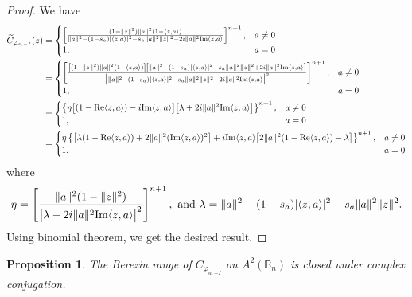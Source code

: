 \documentclass{amsart}
\newtheorem{proposition}{Proposition}
\theoremstyle{remark}
\newcommand{\B}{\mathbb{B}}
\begin{document}
\begin{proof}
We have
     \begin{align*}
        \widetilde{C}_{\varphi_{a,-I}}(z) &= 
        \begin{cases}
            \left[\frac{(1 - \|z\|^{2})\|a\|^{2}(1 - \langle z,a \rangle)}{\|a\|^{2} - (1-s_a)|\langle z,a \rangle|^2 - s_{a}\|a\|^2\|z\|^2-2i\|a\|^{2}\mathrm{Im}\langle z,a \rangle}\right]^{n+1}, & a \neq 0 \\
            1, & a = 0
        \end{cases} \\
        &= 
         \begin{cases}
            \left[\frac{\left[(1 - \|z\|^{2})\|a\|^{2}(1 - \langle z,a \rangle)\right]\left[\|a\|^{2} - (1-s_a)|\langle z,a \rangle|^2 - s_{a}\|a\|^2\|z\|^2+2i\|a\|^{2}\mathrm{Im}\langle z,a \rangle \right]}{\big{|}\|a\|^{2} - (1-s_a)|\langle z,a \rangle|^2 - s_{a}\|a\|^2\|z\|^2-2i\|a\|^{2}\mathrm{Im}\langle z,a \rangle\big{|}^2}\right]^{n+1}, & a \neq 0 \\
            1, & a = 0
        \end{cases} \\
        &= 
         \begin{cases}
          \left\{\eta\big{[}(1 - \mathrm{Re}\langle z,a\rangle) - i\mathrm{Im}\langle z,a\rangle \big{]}\big{[}\lambda+2i\|a\|^{2}\mathrm{Im}\langle z,a \rangle \big{]}\right\}^{n+1}, & a \neq 0 \\
            1, & a = 0
        \end{cases} \\
        &= 
         \begin{cases}
          \eta\left\{\big{[}\lambda(1 - \mathrm{Re}\langle z,a\rangle)  + 2\|a\|^{2}(\mathrm{Im}\langle z,a \rangle)^2\big{]} + i\mathrm{Im}\langle z,a \rangle\big{[}2\|a\|^2(1 - \mathrm{Re}\langle z,a\rangle)-\lambda \big{]} \right\}^{n+1}, & a \neq 0 \\
            1, & a = 0
        \end{cases}
    \end{align*}
    where      
    \[\eta=\left[\frac{\|a\|^{2}(1 - \|z\|^{2})}{\big{|} \lambda-2i\|a\|^{2}\mathrm{Im}\langle z,a \rangle\big{|}^2}\right]^{n+1},\text{ and }
    \lambda=\|a\|^{2} - (1-s_a)|\langle z,a \rangle|^2 - s_{a}\|a\|^2\|z\|^2.\]
Using binomial theorem, we get the desired result.
\end{proof}\begin{proposition}\label{propconju}
The Berezin range of $C_{\varphi_{a,-I}}$ on $A^2(\B_n)$ is closed under complex conjugation.
\end{proposition}
\end{document}
